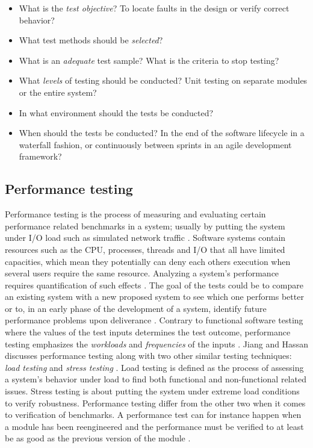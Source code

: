 \begin{itemize}
  \item What is the \textit{test objective}? To locate faults in the design or
    verify correct behavior?
  \item What test methods should be \textit{selected}?
  \item What is an \textit{adequate} test sample? What is the criteria to stop
    testing?
  \item What \textit{levels} of testing should be conducted? Unit testing on
    separate modules or the entire system?
  \item In what environment should the tests be conducted?
  \item When should the tests be conducted? In the end of the software
    lifecycle in a waterfall fashion, or continuously between sprints in an
    agile development framework?
\end{itemize}

\subsection{Performance testing}

Performance testing is the process of measuring and evaluating certain
performance related benchmarks in a system; usually by putting the system under
I/O load such as simulated network traffic \cite{jiang2015survey}. Software
systems contain resources such as the CPU, processes, threads and I/O that all
have limited capacities, which mean they potentially can deny each others
execution when several users require the same resource. Analyzing a system's
performance requires quantification of such effects \cite{woodside2007future}.
The goal of the tests could be to compare an existing system with a new
proposed system to see which one performs better \cite{avritzer1996deriving} or
to, in an early phase of the development of a system, identify future
performance problems upon deliverance \cite{weyuker2000experience}. Contrary to
functional software testing where the values of the test inputs determines the
test outcome, performance testing emphasizes the \textit{workloads} and
\textit{frequencies} of the inputs \cite{weyuker2000experience}. Jiang and
Hassan discusses performance testing along with two other similar testing
techniques: \textit{load testing} and \textit{stress testing}
\cite{jiang2015survey}. Load testing is defined as the process of assessing a
system's behavior under load to find both functional and non-functional related
issues. Stress testing is about putting the system under extreme load
conditions to verify robustness.  Performance testing differ from the other two
when it comes to verification of benchmarks. A performance test can for
instance happen when a module has been reengineered and the performance must be
verified to at least be as good as the previous version of the module
\cite{jiang2015survey}.

